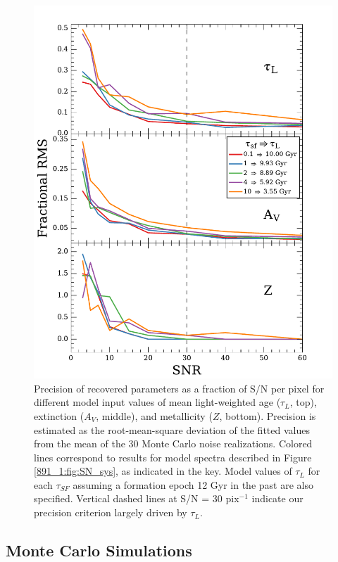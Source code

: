 \begin{figure}
  \centering
  \includegraphics[width=\columnwidth]{891_1/figs/SN_rms.pdf}
  \caption[Precision of derived parameters as a function of
  S/N]{\label{891_1:fig:SN_rms}\fixspacing Precision of recovered parameters
    as a fraction of S/N per pixel for different model input values of
    mean light-weighted age ($\tau_L$, top), extinction ($A_V$,
    middle), and metallicity ($Z$, bottom).  Precision is estimated as
    the root-mean-square deviation of the fitted values from the mean
    of the 30 Monte Carlo noise realizations. Colored lines correspond
    to results for model spectra described in Figure \ref{891_1:fig:SN_sys},
    as indicated in the key. Model values of $\tau_L$ for each
    $\tau_{SF}$ assuming a formation epoch 12 Gyr in the past are also
    specified. Vertical dashed lines at S/N = 30 pix$^{-1}$ indicate
    our precision criterion largely driven by $\tau_L$.}
\end{figure}

\subsection{Monte Carlo Simulations}
\label{891_1:sec:sims}

